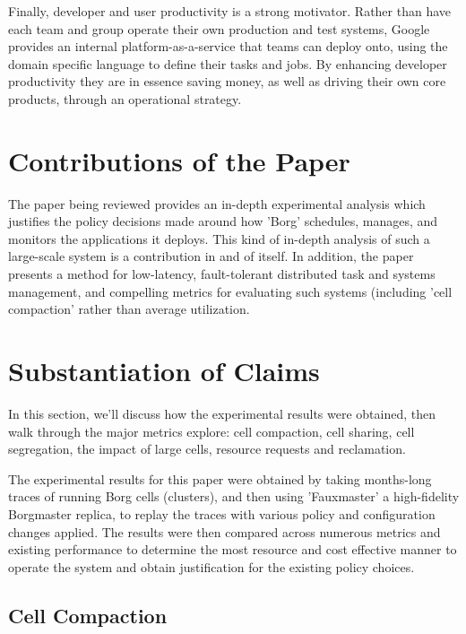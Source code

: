 \documentclass[runningheads,a4paper]{llncs}
\begin{document}
Finally, developer and user productivity is a strong motivator.  Rather than have each team and group operate their own production and test systems, Google provides an internal platform-as-a-service that teams can deploy onto, using the domain specific language to define their tasks and jobs.  By enhancing developer productivity they are in essence saving money, as well as driving their own core products, through an operational strategy.  

\section{Contributions of the Paper}
The paper being reviewed provides an in-depth experimental analysis which justifies the policy decisions made around how 'Borg' schedules, manages, and monitors the applications it deploys.  This kind of in-depth analysis of such a large-scale system is a contribution in and of itself.  In addition, the paper presents a method for low-latency, fault-tolerant distributed task and systems management, and compelling metrics for evaluating such systems (including 'cell compaction' rather than average utilization.

\section{Substantiation of Claims}
In this section, we'll discuss how the experimental results were obtained,  then walk through the major metrics explore: cell compaction, cell sharing, cell segregation,  the impact of large cells, resource requests and reclamation.  

The experimental results for this paper were obtained by taking months-long traces of running Borg cells (clusters), and then using 'Fauxmaster' a high-fidelity Borgmaster replica, to replay the traces with various policy and configuration changes applied.  The results were then compared across numerous metrics and existing performance to determine the most resource and cost effective manner to operate the system and obtain justification for the existing policy choices. 

\subsection{Cell Compaction}
\end{document}
